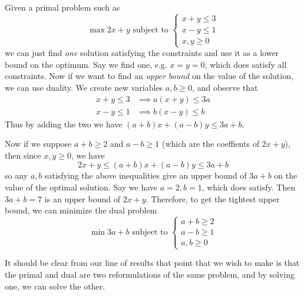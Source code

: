   \begin{example}
    \label{ex:manual-derivation-of-dual-from-primal}
		Given a primal problem such as 
    \begin{equation}
      \max{2x + y} \text{ subject to } \begin{cases} x + y \leq 3 \\ x - y \leq 1 \\ x, y \geq 0 \end{cases} 
    \end{equation}
    we can just find \textit{one} solution satisfying the constraints and use it as a lower bound on the optimum. Say we find one, e.g. $x = y = 0$, which does satisfy all constraints. Now if we want to find an \textit{upper bound} on the value of the solution, we can use duality. We create new variables $a, b \geq 0$, and observe that 
    \begin{align}
      x + y \leq 3 & \implies a (x + y) \leq 3a \\
      x - y \leq 1 & \implies b (x - y) \leq b
    \end{align}
    Thus by adding the two we have $(a + b) x + (a - b) y \leq 3a + b$. 

    Now if we suppose $a + b \geq 2$ and $a - b \geq 1$ (which are the coeffients of $2x + y$), then since $x, y \geq 0$, we have 
    \begin{equation}
      2x + y \leq (a + b) x + (a - b) y \leq 3a + b
    \end{equation} 
    so any $a, b$ satisfying the above inequalities give an upper bound of $3a + b$ on the value of the optimal solution. Say we have $a = 2, b = 1$, which does satisfy. Then $3a + b = 7$ is an upper bound of $2x + y$. Therefore, to get the tightest upper bound, we can minimize the dual problem 
    \begin{equation}
      \min{3a + b} \text{ subject to } \begin{cases} a + b \geq 2 \\ a - b \geq 1 \\ a, b \geq 0 \end{cases}
    \end{equation}
  \end{example}

	It should be clear from our line of results that point that we wish to make is that the primal and dual are two reformulations of the same problem, and by solving one, we can solve the other. 

